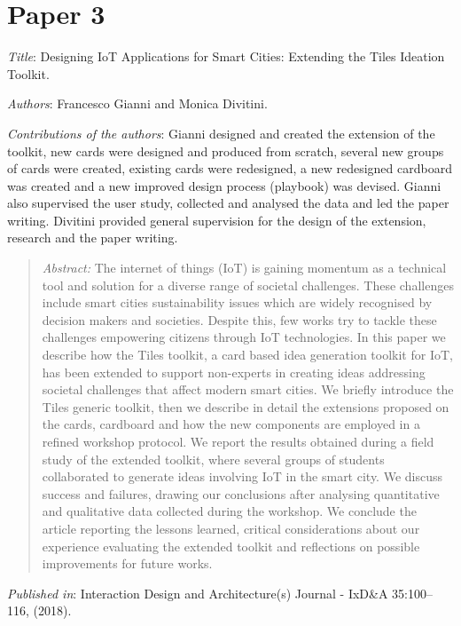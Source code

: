 \section[P3: Designing IoT Applications for Smart Cities: Extending the Tiles Ideation Toolkit.][Paper 3]{Paper 3}
\label{paper-3}

\emph{Title}: Designing IoT Applications for Smart Cities: Extending the Tiles Ideation Toolkit.

\emph{Authors}: Francesco Gianni and Monica Divitini.

\emph{Contributions of the authors}: Gianni designed and created the extension of the toolkit, new cards were designed and produced from scratch, several new groups of cards were created, existing cards were redesigned, a new redesigned cardboard was created and a new improved design process (playbook) was devised. Gianni also supervised the user study, collected and analysed the data and led the paper writing. Divitini provided general supervision for the design of the extension, research and the paper writing.

\begin{quote}
	\emph{Abstract:} The internet of things (IoT) is gaining momentum as a technical tool and solution for a diverse range of societal challenges. These challenges include smart cities sustainability issues which are widely recognised by decision makers and societies. Despite this, few works try to tackle these challenges empowering citizens through IoT technologies. In this paper we describe how the Tiles toolkit, a card based idea generation toolkit for IoT, has been extended to support non-experts in creating ideas addressing societal challenges that affect modern smart cities. We briefly introduce the Tiles generic toolkit, then we describe in detail the extensions proposed on the cards, cardboard and how the new components are employed in a refined workshop protocol. We report the results obtained during a field study of the extended toolkit, where several groups of students collaborated to generate ideas involving IoT in the smart city. We discuss success and failures, drawing our conclusions after analysing quantitative and qualitative data collected during the workshop. We conclude the article reporting the lessons learned, critical considerations about our experience evaluating the extended toolkit and reflections on possible improvements for future works.
\end{quote}

\emph{Published in}: Interaction Design and Architecture(s) Journal - IxD\&A 35:100--116, (2018).

